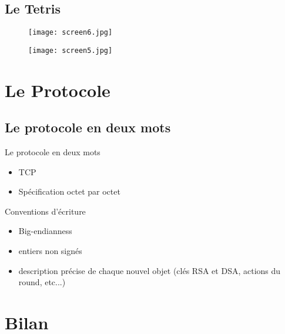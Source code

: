 \documentclass{beamer}
\begin{document}
\subsection{Le Tetris}
\begin{frame}
  \begin{figure}[H]
    \begin{center}
      \texttt{[image: screen6.jpg]}
    \end{center}
  \end{figure}
\end{frame}

\begin{frame}
  \begin{figure}[H]
    \begin{center}
      \texttt{[image: screen5.jpg]}
    \end{center}
  \end{figure}
\end{frame}

\section{Le Protocole}
\subsection{Le protocole en deux mots}
\begin{frame}

\begin{block}{Le protocole en deux mots}
\begin{itemize}
\item TCP
\item Spécification octet par octet
\end{itemize}
\end{block}

\begin{block}{Conventions d'écriture}
\begin{itemize}
\item Big-endianness
\item entiers non signés
\item description précise de chaque nouvel objet (clés RSA et DSA,
 actions du round, etc...)
\end{itemize}
\end{block}

\end{frame}

\section{Bilan}
\end{document}
